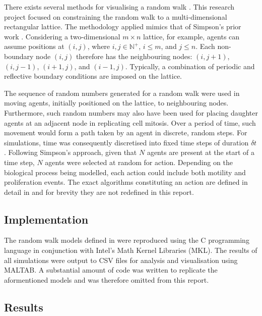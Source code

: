 \documentclass[11pt,titlepage,a4paper]{article}
\begin{document}
		There exists several methods for visualising a random walk \cite{grinstead1997}. This research project focused on constraining the random walk to a multi-dimensional rectangular lattice. The methodology applied mimics that of Simpson's prior work \cite{simpson2009diffusing,simpson2010cell}. Considering a two-dimensional $m \times n$ lattice, for example, agents can assume positions at $(i, j)$, where $i, j \in \mathbb{N^+}$, $i \le m$, and $j \le n$. Each non-boundary node $(i, j)$ therefore has the neighbouring nodes: $(i, j + 1)$, $(i, j - 1)$, $(i + 1, j)$, and $(i - 1, j)$. Typically, a combination of periodic \cite{periodiccond} and reflective boundary conditions \cite{reflectivecond} are imposed on the lattice. 

		The sequence of random numbers generated for a random walk were used in moving agents, initially positioned on the lattice, to neighbouring nodes. Furthermore, such random numbers may also have been used for placing daughter agents at an adjacent node in replicating cell mitosis. Over a period of time, such movement would form a path taken by an agent in discrete, random steps. For simulations, time was consequently discretised into fixed time steps of duration $\delta t$. Following Simpson's approach, given that $N$ agents are present at the start of a time step, $N$ agents were selected at random for action. Depending on the biological process being modelled, each action could include both motility and proliferation events. The exact algorithms constituting an action are defined in detail in \cite{simpson2009diffusing,simpson2010cell} and for brevity they are not redefined in this report.
	

	\subsection{Implementation}
		\label{sub:implementation}
		
		The random walk models defined in \cite{simpson2009diffusing,simpson2010cell} were reproduced using the C programming language in conjunction with Intel's Math Kernel Libraries (MKL). The results of all simulations were output to CSV files for analysis and visualisation using MALTAB. A substantial amount of code was written to replicate the aformentioned models and was therefore omitted from this report.
	

	\subsection{Results}
		\label{sub:results}
		
\end{document}
